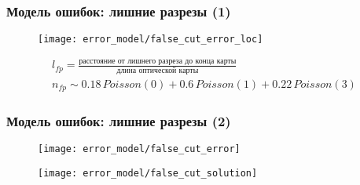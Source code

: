 \begin{frame}
\frametitle{Модель ошибок: лишние разрезы (1)}
\begin{figure}
  \centering
  \texttt{[image: error\_model/false\_cut\_error\_loc]}
\end{figure}
\begin{gather*}
l_{fp} = \frac{\text{расстояние от лишнего разреза до конца карты}}{\text{длина оптической карты}} \\
n_{fp} \sim 0.18\, Poisson(0) + 0.6 \, Poisson(1) + 0.22 \, Poisson(3)
\end{gather*}

\end{frame}

\begin{frame}
\frametitle{Модель ошибок: лишние разрезы (2)}
\begin{figure}
  \centering
  \texttt{[image: error\_model/false\_cut\_error]}
\end{figure}
\begin{figure}
  \centering
  \texttt{[image: error\_model/false\_cut\_solution]}
\end{figure}
\end{frame}
